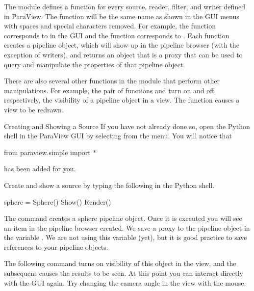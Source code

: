 The  module defines a function for every source,
reader, filter, and writer defined in ParaView.  The function will be the
same name as shown in the GUI menus with spaces and special characters
removed.  For example, the  function corresponds to
 \ra {} in the GUI and the 
function corresponds to  \ra {} \ra {}.  Each function creates a pipeline object, which will show up
in the pipeline browser (with the exception of writers), and returns an
object that is a proxy that can be used to query and manipulate the
properties of that pipeline object.

There are also several other functions in the 
module that perform other manipulations.  For example, the pair of
functions  and  turn on and off, respectively,
the visibility of a pipeline object in a view.  The 
function causes a view to be redrawn.

\begin{exercise}{Creating and Showing a Source}
  \label{ex:CreatingAndShowingASource}%
  If you have not already done so, open the Python shell in the ParaView
  GUI by selecting  \ra {} from the menu.  You
  will notice that
  \begin{python}
from paraview.simple import *
  \end{python}
  has been added for you.

  Create and show a  source by typing the following in the
  Python shell.
  \begin{python}
sphere = Sphere()
Show()
Render()
  \end{python}

  The  command creates a sphere pipeline object.  Once it is
  executed you will see an item in the pipeline browser created.  We save a
  proxy to the pipeline object in the variable .  We are
  not using this variable (yet), but it is good practice to save references
  to your pipeline objects.

  The following  command turns on visibility of this object in
  the view, and the subsequent  causes the results to be
  seen.  At this point you can interact directly with the GUI again.  Try
  changing the camera angle in the view with the mouse.
\end{exercise}

